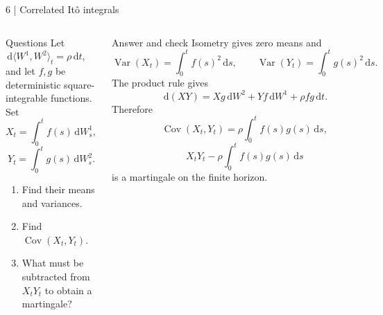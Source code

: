 \documentclass[handout,10pt,t,aspectratio=169]{beamer}
\newcommand{\dd}{\,\mathrm d}
\newcommand{\Var}{\operatorname{Var}}
\newcommand{\Cov}{\operatorname{Cov}}
\newenvironment{questions}{\begin{block}{Questions}}{\end{block}}
\newenvironment{answers}{\begin{exampleblock}{Answer and check}}{\end{exampleblock}}
\newcommand{\compact}{\small%
 \setlength{\abovedisplayskip}{3pt}%
 \setlength{\belowdisplayskip}{3pt}%
 \setlength{\abovedisplayshortskip}{2pt}%
 \setlength{\belowdisplayshortskip}{2pt}%
 \setlength{\parskip}{2pt}}
\begin{document}
\begin{frame}{6 | Correlated It\^o integrals}
\compact
\begin{columns}[T,onlytextwidth]
\begin{questions}
Let \(\dd\langle W^1,W^2\rangle_t=\rho\dd t\), and let \(f,g\) be
deterministic square-integrable functions. Set
\[
 X_t=\int_0^t f(s)\dd W_s^1,
\]
\[
 Y_t=\int_0^t g(s)\dd W_s^2.
\]
\begin{enumerate}
\item Find their means and variances.
\item Find \(\Cov(X_t,Y_t)\).
\item What must be subtracted from \(X_tY_t\) to obtain a martingale?
\end{enumerate}
\end{questions}
\begin{answers}
Isometry gives zero means and
\[
 \Var(X_t)=\int_0^t f(s)^2\dd s,\qquad
 \Var(Y_t)=\int_0^t g(s)^2\dd s.
\]
The product rule gives
\[
 \dd(XY)=Xg\dd W^2+Yf\dd W^1+\rho fg\dd t.
\]
Therefore
\[
 \boxed{\Cov(X_t,Y_t)=\rho\int_0^t f(s)g(s)\dd s,}
\]
\[
 \boxed{X_tY_t-\rho\int_0^t f(s)g(s)\dd s}
\]
is a martingale on the finite horizon.
\end{answers}
\end{columns}
\end{frame}
\end{document}
